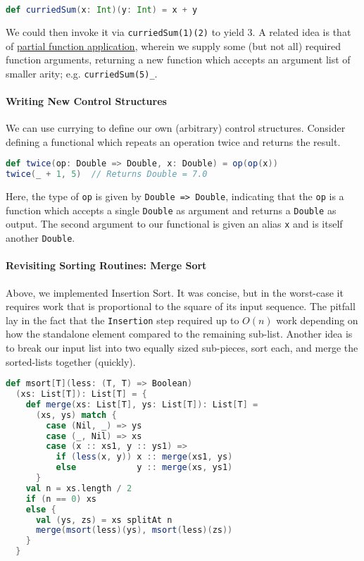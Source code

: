 \documentclass[12pt,letterpaper,twoside]{article}
\begin{document}
\begin{lstlisting}[language=Scala] 
def curriedSum(x: Int)(y: Int) = x + y 
\end{lstlisting} 
We could then invoke it via \texttt{curriedSum(1)(2)} to yield 3. A related idea
is that of 
\href{https://en.wikipedia.org/wiki/Partial_application}{partial function application}, 
wherein we supply some (but not all)
required function arguments, returning a new function which accepts an argument list
of smaller arity; e.g. \texttt{curriedSum(5)\_}.

\paragraph{Writing New Control Structures}
We can use currying to define our own (arbitrary) control structures. Consider defining
a functional which repeats an operation twice and returns the result.
\begin{lstlisting}[language=Scala]
def twice(op: Double => Double, x: Double) = op(op(x))
twice(_ + 1, 5)  // Returns Double = 7.0 
\end{lstlisting}
Here, the type of \texttt{op} is given by \texttt{Double => Double}, indicating that
the \texttt{op} is a function which accepts a single \texttt{Double} as argument
and returns a \texttt{Double} as output. The second argument to our functional is
given an alias \texttt{x} and is itself another \texttt{Double}.

\paragraph{Revisiting Sorting Routines: Merge Sort} 
Above, we implemented Insertion Sort. It was concise,
but in the worst-case it requires work that is proportional to the square of its input
sequence. The pitfall lay in the fact that the \texttt{Insertion} step required up
to $O(n)$ work depending on how the standalone element compared to the remaining sub-list.
Another idea is to break our input list into two equally sized sub-pieces, sort each, and
merge the sorted-lists together (quickly).

{\small
\begin{lstlisting}[language=Scala]
def msort[T](less: (T, T) => Boolean)
  (xs: List[T]): List[T] = {
    def merge(xs: List[T], ys: List[T]): List[T] =
      (xs, ys) match {
        case (Nil, _) => ys
        case (_, Nil) => xs
        case (x :: xs1, y :: ys1) =>
          if (less(x, y)) x :: merge(xs1, ys)
          else            y :: merge(xs, ys1)
      }
    val n = xs.length / 2
    if (n == 0) xs
    else {
      val (ys, zs) = xs splitAt n
      merge(msort(less)(ys), msort(less)(zs))
    }
  }  
\end{lstlisting}
}
\end{document}
